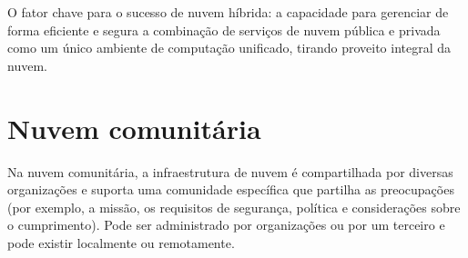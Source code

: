 O fator chave para o sucesso de nuvem híbrida: a capacidade para gerenciar de
forma eficiente e segura a combinação de serviços de nuvem pública e privada
como um único ambiente de computação unificado, tirando proveito integral da
nuvem.

\section{Nuvem comunitária}
Na nuvem comunitária, a infraestrutura de nuvem é compartilhada por diversas
organizações e suporta uma comunidade específica que partilha as preocupações
(por exemplo, a missão, os requisitos de segurança, política e considerações sobre
o cumprimento). Pode ser administrado por organizações ou por um terceiro e pode
existir localmente ou remotamente.
